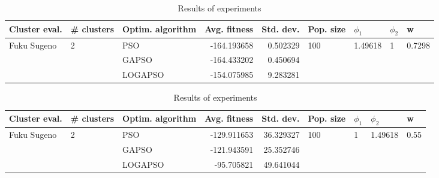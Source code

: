 \documentclass{article}
\begin{document}
\begin{table}
\centering
\caption{Results of experiments}
\begin{tabular}{lllrrllll}
\toprule
               Cluster eval. &        \# clusters & Optim. algorithm &  Avg. fitness &  Std. dev. &            Pop. size &               $\phi_{1}$ &         $\phi_{2}$ &                       w \\
\midrule
\multirow{3}{*}{Fuku Sugeno} & \multirow{3}{*}{2} &              PSO &   -164.193658 &   0.502329 & \multirow{3}{*}{100} & \multirow{3}{*}{1.49618} & \multirow{3}{*}{1} & \multirow{3}{*}{0.7298} \\
                             &                    &            GAPSO &   -164.433202 &   0.450694 &                      &                          &                    &                         \\
                             &                    &          LOGAPSO &   -154.075985 &   9.283281 &                      &                          &                    &                         \\
\bottomrule
\end{tabular}
\end{table}
\begin{table}
\centering
\caption{Results of experiments}
\begin{tabular}{lllrrllll}
\toprule
               Cluster eval. &        \# clusters & Optim. algorithm &  Avg. fitness &  Std. dev. &            Pop. size &         $\phi_{1}$ &               $\phi_{2}$ &                     w \\
\midrule
\multirow{3}{*}{Fuku Sugeno} & \multirow{3}{*}{2} &              PSO &   -129.911653 &  36.329327 & \multirow{3}{*}{100} & \multirow{3}{*}{1} & \multirow{3}{*}{1.49618} & \multirow{3}{*}{0.55} \\
                             &                    &            GAPSO &   -121.943591 &  25.352746 &                      &                    &                          &                       \\
                             &                    &          LOGAPSO &    -95.705821 &  49.641044 &                      &                    &                          &                       \\
\bottomrule
\end{tabular}
\end{table}
\end{document}
